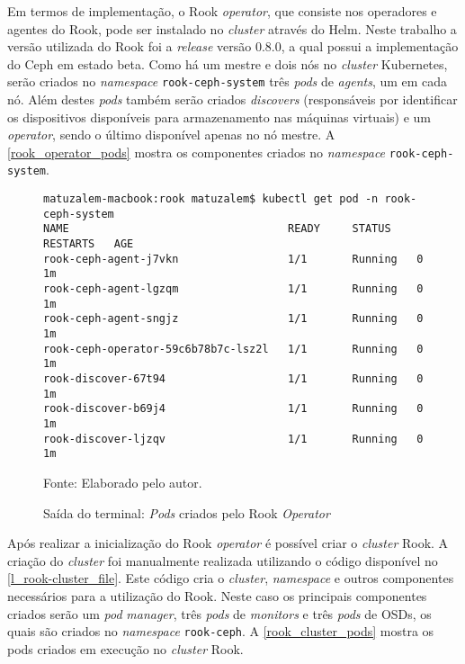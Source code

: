 Em termos de implementação, o Rook \textit{operator}, que consiste nos operadores e agentes do Rook, pode ser instalado no \textit{cluster} através do Helm. Neste trabalho a versão utilizada do Rook foi a \textit{release} versão 0.8.0, a qual possui a implementação do Ceph em estado beta. Como há um mestre e dois nós no \textit{cluster} Kubernetes, serão criados no \textit{namespace} \texttt{rook-ceph-system} três \textit{pods} de \textit{agents}, um em cada nó. Além destes \textit{pods} também serão criados \textit{discovers} (responsáveis por identificar os dispositivos disponíveis para armazenamento nas máquinas virtuais) e um \textit{operator}, sendo o último disponível apenas no nó mestre. A \autoref{rook_operator_pods} mostra os componentes criados no \textit{namespace} \texttt{rook-ceph-system}.

\begin{figure}[!htpb]
	\centering
	\caption{Saída do terminal: \textit{Pods} criados pelo Rook \textit{Operator}}
    \begin{verbatim}
matuzalem-macbook:rook matuzalem$ kubectl get pod -n rook-ceph-system
NAME                                  READY     STATUS    RESTARTS   AGE
rook-ceph-agent-j7vkn                 1/1       Running   0          1m
rook-ceph-agent-lgzqm                 1/1       Running   0          1m
rook-ceph-agent-sngjz                 1/1       Running   0          1m
rook-ceph-operator-59c6b78b7c-lsz2l   1/1       Running   0          1m
rook-discover-67t94                   1/1       Running   0          1m
rook-discover-b69j4                   1/1       Running   0          1m
rook-discover-ljzqv                   1/1       Running   0          1m
    \end{verbatim}
	Fonte: Elaborado pelo autor.
 	\label{rook_operator_pods}
\end{figure}

Após realizar a inicialização do Rook \textit{operator} é possível criar o \textit{cluster} Rook. A criação do \textit{cluster} foi manualmente realizada utilizando o código disponível no \autoref{l_rook-cluster_file}. Este código cria o \textit{cluster}, \textit{namespace} e outros componentes necessários para a utilização do Rook. Neste caso os principais componentes criados serão um \textit{pod} \textit{manager}, três \textit{pods} de \textit{monitors} e três \textit{pods} de \ac{OSD}s, os quais são criados no \textit{namespace} \texttt{rook-ceph}. A \autoref{rook_cluster_pods} mostra os pods criados em execução no \textit{cluster} Rook.

